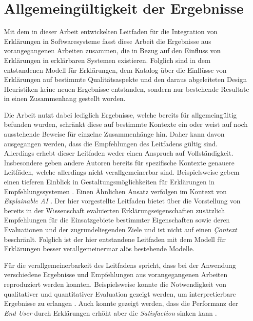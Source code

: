 \section{Allgemeingültigkeit der Ergebnisse}

Mit dem in dieser Arbeit entwickelten Leitfaden für die Integration von Erklärungen in Softwaresysteme fasst diese Arbeit die Ergebnisse aus vorangegangenen Arbeiten zusammen, die in Bezug auf den Einfluss von Erklärungen in erklärbaren Systemen existieren. Folglich sind in dem entstandenen Modell für Erklärungen, dem Katalog über die Einflüsse von Erklärungen auf bestimmte Qualitätsaspekte und den daraus abgeleiteten Design Heuristiken keine neuen Ergebnisse entstanden, sondern nur bestehende Resultate in einen Zusammenhang gestellt worden.

Die Arbeit nutzt dabei lediglich Ergebnisse, welche bereits für allgemeingültig befunden wurden, schränkt diese auf bestimmte Kontexte ein oder weist auf noch ausstehende Beweise für einzelne Zusammenhänge hin. Daher kann davon ausgegangen werden, dass die Empfehlungen des Leitfadens gültig sind. Allerdings erhebt dieser Leitfaden weder einen Anspruch auf Vollständigkeit. Insbesondere geben andere Autoren bereits für spezifische Kontexte genauere Leitfäden, welche allerdings nicht verallgemeinerbar sind. Beispielsweise gebem \citeauthor{nunes_systematic_2017} einen tieferen Einblick in Gestaltungsmöglichkeiten für Erklärungen in Empfehlungssystemen \cite{nunes_systematic_2017}. Einen Ähnlichen Ansatz verfolgen \citeauthor{sokol_explainability_2020} im Kontext von \textit{Explainable AI} \cite{sokol_explainability_2020}. Der hier vorgestellte Leitfaden bietet über die Vorstellung von bereits in der Wissenschaft evaluierten Erklärungseigenschaften zusätzlich Empfehlungen für die Einsatzgebiete bestimmter Eigenschaften sowie deren Evaluationen und der zugrundeliegenden Ziele und ist nicht auf einen \textit{Çontext} beschränlt. Folglich ist der hier entstandene Leitfaden mit dem Modell für Erklärungen besser verallgemeinermar alös bestehende Modelle.

Für die verallgemeinerbarkeit des Leitfadens spricht, dass bei der Anwendung verschiedene Ergebnisse und Empfehlungen aus vorangegangenen Arbeiten reproduziert werden konnten. Beispielsweise konnte die Notwendigkeit von qualitativer und quantitativer Evaluation gezeigt werden, um interpretierbare Ergebnisse zu erlangen \cite{}. Auch konnte gezeigt werden, dass die Performanz der \textit{End User} durch Erklärungen erhöht aber die \textit{Satisfaction} sinken kann \cite{}. 

